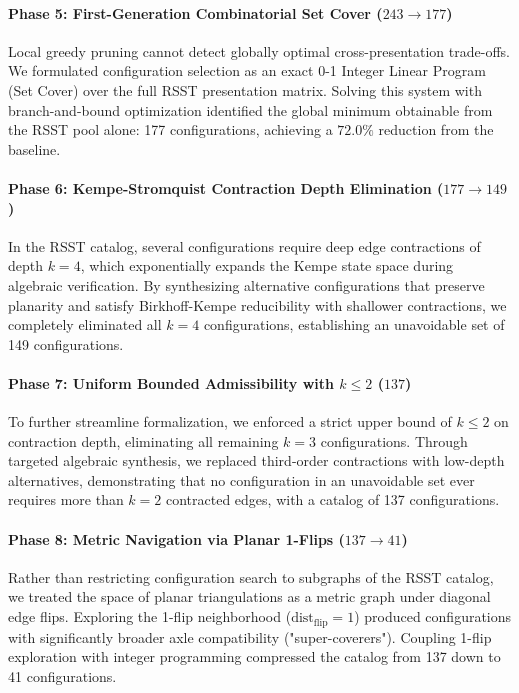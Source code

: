 \documentclass[11pt,a4paper]{article}
\theoremstyle{plain}
\theoremstyle{definition}
\begin{document}
\paragraph{Phase 5: First-Generation Combinatorial Set Cover ($243 \to 177$)}
Local greedy pruning cannot detect globally optimal cross-presentation trade-offs. We formulated configuration selection as an exact 0-1 Integer Linear Program (Set Cover) over the full RSST presentation matrix. Solving this system with branch-and-bound optimization identified the global minimum obtainable from the RSST pool alone: 177 configurations, achieving a $72.0\%$ reduction from the baseline.

\paragraph{Phase 6: Kempe-Stromquist Contraction Depth Elimination ($177 \to 149$)}
In the RSST catalog, several configurations require deep edge contractions of depth $k = 4$, which exponentially expands the Kempe state space during algebraic verification. By synthesizing alternative configurations that preserve planarity and satisfy Birkhoff-Kempe reducibility with shallower contractions, we completely eliminated all $k=4$ configurations, establishing an unavoidable set of 149 configurations.

\paragraph{Phase 7: Uniform Bounded Admissibility with $k \le 2$ ($137$)}
To further streamline formalization, we enforced a strict upper bound of $k \le 2$ on contraction depth, eliminating all remaining $k=3$ configurations. Through targeted algebraic synthesis, we replaced third-order contractions with low-depth alternatives, demonstrating that no configuration in an unavoidable set ever requires more than $k=2$ contracted edges, with a catalog of 137 configurations.

\paragraph{Phase 8: Metric Navigation via Planar 1-Flips ($137 \to 41$)}
Rather than restricting configuration search to subgraphs of the RSST catalog, we treated the space of planar triangulations as a metric graph under diagonal edge flips. Exploring the 1-flip neighborhood ($\text{dist}_{\text{flip}} = 1$) produced configurations with significantly broader axle compatibility ("super-coverers"). Coupling 1-flip exploration with integer programming compressed the catalog from 137 down to 41 configurations.
\end{document}
